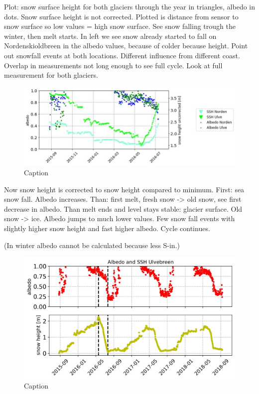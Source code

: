 \documentclass[11pt]{report}
\begin{document}
Plot: snow surface height for both glaciers through the year in triangles, albedo in dots. Snow surface height is not corrected. Plotted is distance from sensor to snow surface so low values = high snow surface. See snow falling trough the winter, then melt starts. In left we see snow already started to fall on Nordenskioldbreen in the albedo values, because of colder because height. Point out snowfall events at both locations. Different influence from different coast. Overlap in measurements not long enough to see full cycle. Look at full measurement for both glaciers.

\begin{figure}[h]
\includegraphics[scale=1, width=1\textwidth]{Picture1.jpg}

\caption{Caption}
\label{fig: S1}
\end{figure}

Now snow height is corrected to snow height compared to minimum. First: sea snow fall. Albedo increases. Than: first melt, fresh snow -> old snow, see first decrease in albedo. Than melt ends and level stays stable: glacier surface. Old snow -> ice. Albedo jumps to much lower values. Few snow fall events with slightly higher snow height and fast higher albedo. Cycle continues. 

(In winter albedo cannot be calculated because less S-in.)

\begin{figure}[h]
\includegraphics[scale=1, width=1\textwidth]{Picture2.jpg}

\caption{Caption}
\label{fig: S2}
\end{figure}
\end{document}

